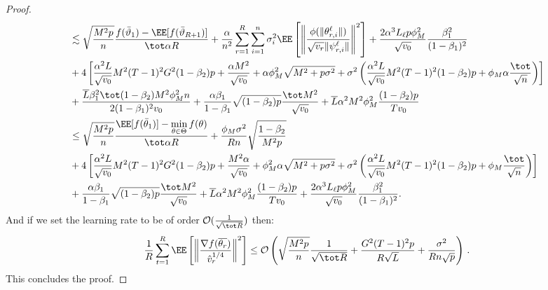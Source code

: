 \documentclass[nohyperref]{article}
\theoremstyle{plain}
\theoremstyle{definition}
\theoremstyle{remark}
\begin{document}
\begin{proof}
\begin{align*}
    & \lesssim  \sqrt{\frac{M^2 p}{n}} \frac{ f(\bar{\vartheta}_1)  - \EE[ f(\bar{\vartheta}_{R+1})]}{\tot \alpha R}+   \frac{\alpha}{n^2}  \sum_{r=1}^R  \sum_{i = 1}^n  \sigma_i^2 \EE\left[ \left\|\frac{\phi(\|\theta_{r,i}^{\ell}\|)}{\sqrt{v_r} \|\psi_{r,i}^{\ell}\|} \right\|^2 \right] +\frac{2\alpha^3 L_\ell p\phi_M^2}{ \sqrt{v_0}}\frac{\beta_1^2}{(1-\beta_1)^2} \nonumber\\
   &   +4 \left[ \frac{\alpha^2 L}{\sqrt{v_0}}  M^2 (T-1)^2 G^2 (1-\beta_2)p + \frac{\alpha M^2}{\sqrt{v_0}}+ \alpha \phi_M^2 \sqrt{M^2+p\sigma^2} + \sigma^2 \left(\frac{\alpha^2 L}{\sqrt{v_0}}  M^2 (T-1)^2(1-\beta_2)p+ \phi_M\alpha \frac{\tot }{\sqrt{n}} \right)\right] \nonumber \\
   &+ \frac{ \overline{L}\beta_1^2\tot(1-\beta_2)M^2 \phi^2_M n}{2(1-\beta_1)^2 v_0} +\frac{\alpha \beta_1}{1-\beta_1}  \sqrt{(1-\beta_2)p} \frac{\tot M^2}{\sqrt{v_0}} +\overline{L} \alpha^2 M^2 \phi_M^2 \frac{(1-\beta_2)p}{Tv_0} \nonumber\\
   & \leq   \sqrt{\frac{M^2 p}{n}}  \frac{ \EE[f(\bar{\theta}_1)]  - \min \limits_{\theta \in \Theta} f(\theta)}{\tot \alpha R} +      \frac{\phi_M   \sigma^2}{R n} \sqrt{\frac{1 - \beta_2}{M^2 p}  } \\
   &+4 \left[ \frac{\alpha^2 L}{\sqrt{v_0}}  M^2 (T-1)^2 G^2 (1-\beta_2)p + \frac{M^2 \alpha }{\sqrt{v_0}}+\phi_M^2 \alpha \sqrt{M^2+p\sigma^2} + \sigma^2 \left(\frac{\alpha^2 L}{\sqrt{v_0}}  M^2 (T-1)^2(1-\beta_2)p+ \phi_M \frac{\tot }{\sqrt{n}} \right)\right] \\
   &+\frac{\alpha \beta_1}{1-\beta_1}  \sqrt{(1-\beta_2)p} \frac{\tot M^2}{\sqrt{v_0}} +\overline{L} \alpha^2 M^2 \phi_M^2 \frac{(1-\beta_2)p}{Tv_0} +\frac{2\alpha^3 L_\ell p\phi_M^2}{ \sqrt{v_0}}\frac{\beta_1^2}{(1-\beta_1)^2}.
\end{align*}
 And if we set the learning rate to be of order $ \mathcal{O}(\frac{1}{ \sqrt{\tot R}})$ then:
 \begin{align*}
     \frac{1}{R}\sum_{t=1}^R  \EE\left[ \left\| \frac{\nabla f(\overline{\theta_r})}{\hat v_r^{1/4}}   \right \|^2 \right] \leq \mathcal{O}\left( \sqrt{\frac{M^2 p}{n}} \frac{1}{\sqrt{\tot R}} + \frac{G^2(T-1)^2p}{R\sqrt{L}}+ \frac{\sigma^2 }{R n\sqrt{p}}\right) \, .
\end{align*}
This concludes the proof.

\end{proof}
\end{document}
